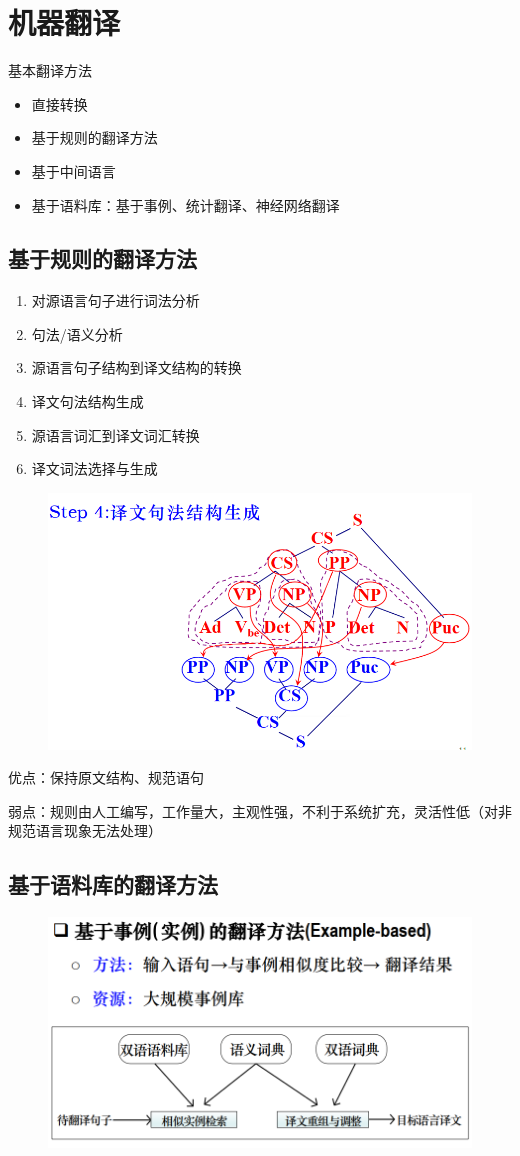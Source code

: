 
\section{机器翻译}
基本翻译方法
\begin{itemize}
	\item 直接转换
	\item 基于规则的翻译方法
	\item 基于中间语言
	\item 基于语料库：基于事例、统计翻译、神经网络翻译
\end{itemize}

\subsection{基于规则的翻译方法}
\begin{enumerate}
	\item 对源语言句子进行词法分析
	\item 句法/语义分析
	\item 源语言句子结构到译文结构的转换
	\item 译文句法结构生成
	\item 源语言词汇到译文词汇转换
	\item 译文词法选择与生成
\end{enumerate}
\begin{figure}[H]
\centering
\includegraphics[width=0.6\linewidth]{fig/rule-based_mt.png}
\end{figure}

优点：保持原文结构、规范语句
\par 弱点：规则由人工编写，工作量大，主观性强，不利于系统扩充，灵活性低（对非规范语言现象无法处理）

\subsection{基于语料库的翻译方法}
\begin{figure}[H]
\centering
\includegraphics[width=0.6\linewidth]{fig/example-based_mt.png}
\end{figure}

